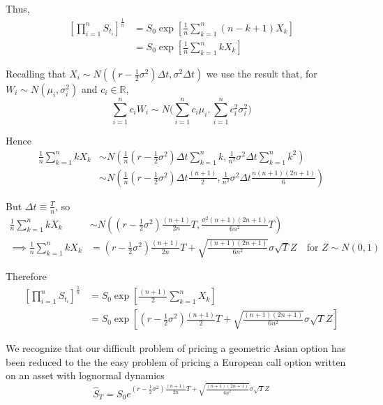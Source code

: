 \documentclass[12pt]{article}
\newlength\tindent
\renewcommand{\indent}{\hspace*{\tindent}}
\begin{document}
Thus,
\begin{align*}
	\left[ \prod^n_{i=1} S_{t_i} \right]^{\frac{1}{n}} &= S_0 \exp\left[ 	\frac{1}{n} \sum^n_{k = 1} (n - k + 1)X_k  \right] \\
	&= S_0 \exp \left[ \frac{1}{n} \sum^n_{k=1}kX_k \right]
\end{align*}

Recalling that $X_i \sim N\left( \left(r - \frac{1}{2}\sigma^2\right)\Delta t, \sigma^2\Delta t \right)$ we use the result that, for $W_i \sim N(\mu_i, \sigma^2_i)$ and $c_i \in \mathbb R$,
\begin{equation*}
	\sum^n_{i=1} c_iW_i \sim N \bigg( \sum^n_{i = 1} c_i\mu_i, \sum^n_{i = 1}c_i^2\sigma^2_i \bigg) 
\end{equation*}

Hence
\begin{align*}
	\frac{1}{n} \sum^n_{k = 1} kX_k &\sim N\left( \frac{1}{n}\left(r - \frac{1}{2}\sigma^2\right)\Delta t \sum^n_{k = 1} k, \frac{1}{n^2}\sigma^2\Delta t \sum^n_{k = 1} k^2 \right) \\
	&\sim N \left( \frac{1}{n}\left(r - \frac{1}{2}\sigma^2\right)\Delta t\frac{(n + 1)}{2}, \frac{1}{n^2}\sigma^2\Delta t \frac{n(n + 1)(2n + 1)}{6}\right)
\end{align*}

But $\Delta t \equiv \frac{T}{n}$, so
\begin{align*}
	\frac{1}{n}\sum^n_{k = 1} kX_k &\sim N\left( \left(r - \frac{1}{2}\sigma^2\right)\frac{(n + 1)}{2n}T, \frac{\sigma^2(n + 1)(2n + 1)}{6n^2}T \right) \\
	\implies \frac{1}{n} \sum^n_{k = 1} kX_k &= \left(r - \frac{1}{2}\sigma^2\right)\frac{(n + 1)}{2n}T + \sqrt{\frac{(n + 1)(2n + 1)}{6n^2}}\sigma\sqrt{T}Z \quad \text{for } Z \sim N(0, 1)
\end{align*}

Therefore
\begin{align*}
	\left[ \prod^n_{i=1} S_{t_i} \right]^{\frac{1}{n}} &= S_0 \exp \left[ \frac{(n + 1)}{2}\sum^n_{k=1}X_k \right] \\
	&= S_0 \exp \left[ \left(r - \frac{1}{2}\sigma^2\right)\frac{(n + 1)}{2}T + \sqrt{\frac{(n + 1)(2n + 1)}{6n^2}}\sigma\sqrt{T}Z \right]	
\end{align*}

\indent We recognize that our difficult problem of pricing a geometric Asian option has been reduced to the the easy problem of pricing a European call option written on an asset with lognormal dynamics
\begin{equation*}
	\hat{S}_T = S_0 e^{ \left(r - \frac{1}{2}\sigma^2\right)\frac{(n + 1)}{2n}T + \sqrt{\frac{(n + 1)(2n + 1)}{6n^2}}\sigma\sqrt{T}Z } 
\end{equation*}
\end{document}
